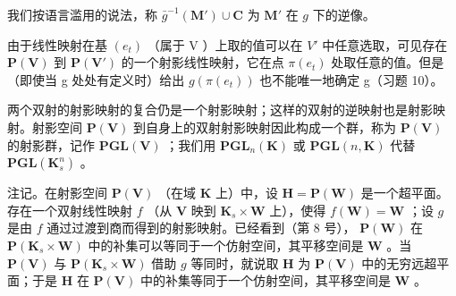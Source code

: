 我们按语言滥用的说法，称 \(\bar{g}^{-1}(\mathbf{M}') \cup \mathbf{C}\) 为 \(\mathbf{M}'\) 在 \(g\) 下的逆像。

由于线性映射在基 \((e_{t})\) （属于 V ）上取的值可以在 \(V'\) 中任意选取，可见存在 \(\mathbf{P}(\mathbf{V})\) 到 \(\mathbf{P}(\mathbf{V}')\) 的一个射影线性映射，它在点 \(\pi(e_{t})\) 处取任意的值。但是（即使当 g 处处有定义时）给出 \(g(\pi(e_{t}))\) 也不能唯一地确定 g（习题 10）。

两个双射的射影映射的复合仍是一个射影映射；这样的双射的逆映射也是射影映射。射影空间 \(\mathbf{P}(\mathbf{V})\) 到自身上的双射射影映射因此构成一个群，称为 \(\mathbf{P}(\mathbf{V})\) 的射影群，记作 \(\mathbf{PGL}(\mathbf{V})\) ；我们用 \(\mathbf{PGL}_{n}(\mathbf{K})\) 或 \(\mathbf{PGL}(n,\mathbf{K})\) 代替 \(\mathbf{PGL}(\mathbf{K}_{s}^{n})\) 。

注记。在射影空间 \(\mathbf{P}(\mathbf{V})\) （在域 \(\mathbf{K}\) 上）中，设 \(\mathbf{H} = \mathbf{P}(\mathbf{W})\) 是一个超平面。存在一个双射线性映射 \(f\) （从 \(\mathbf{V}\) 映到 \(\mathbf{K}_s \times \mathbf{W}\) 上），使得 \(f(\mathbf{W}) = \mathbf{W}\) ；设 \(g\) 是由 \(f\) 通过过渡到商而得到的射影映射。已经看到（第 8 号）， \(\mathbf{P}(\mathbf{W})\) 在 \(\mathbf{P}(\mathbf{K}_s \times \mathbf{W})\) 中的补集可以等同于一个仿射空间，其平移空间是 \(\mathbf{W}\) 。当 \(\mathbf{P}(\mathbf{V})\) 与 \(\mathbf{P}(\mathbf{K}_s \times \mathbf{W})\) 借助 \(g\) 等同时，就说取 \(\mathbf{H}\) 为 \(\mathbf{P}(\mathbf{V})\) 中的无穷远超平面；于是 \(\mathbf{H}\) 在 \(\mathbf{P}(\mathbf{V})\) 中的补集等同于一个仿射空间，其平移空间是 \(\mathbf{W}\) 。

